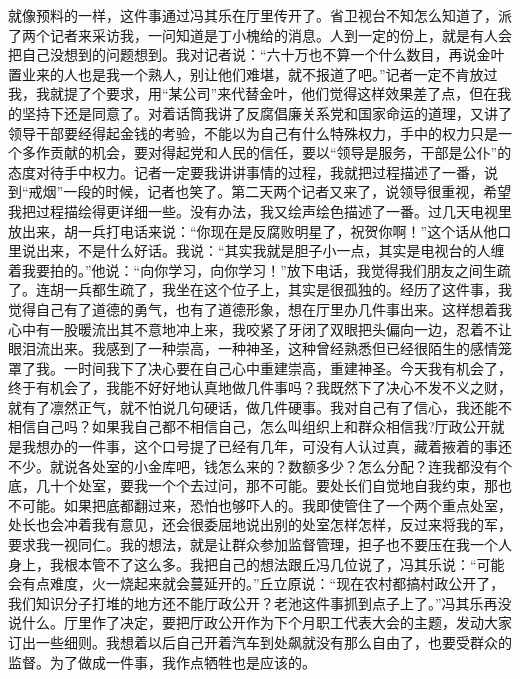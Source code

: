 \documentclass[12pt,oneside]{book}
\begin{document}
就像预料的一样，这件事通过冯其乐在厅里传开了。省卫视台不知怎么知道了，派了两个记者来采访我，一问知道是丁小槐给的消息。人到一定的份上，就是有人会把自己没想到的问题想到。我对记者说：``六十万也不算一个什么数目，再说金叶置业来的人也是我一个熟人，别让他们难堪，就不报道了吧。''记者一定不肯放过我，我就提了个要求，用``某公司''来代替金叶，他们觉得这样效果差了点，但在我的坚持下还是同意了。对着话筒我讲了反腐倡廉关系党和国家命运的道理，又讲了领导干部要经得起金钱的考验，不能以为自己有什么特殊权力，手中的权力只是一个多作贡献的机会，要对得起党和人民的信任，要以``领导是服务，干部是公仆''的态度对待手中权力。记者一定要我讲讲事情的过程，我就把过程描述了一番，说到``戒烟''一段的时候，记者也笑了。第二天两个记者又来了，说领导很重视，希望我把过程描绘得更详细一些。没有办法，我又绘声绘色描述了一番。过几天电视里放出来，胡一兵打电话来说：``你现在是反腐败明星了，祝贺你啊！''这个话从他口里说出来，不是什么好话。我说：``其实我就是胆子小一点，其实是电视台的人缠着我要拍的。''他说：``向你学习，向你学习！''放下电话，我觉得我们朋友之间生疏了。连胡一兵都生疏了，我坐在这个位子上，其实是很孤独的。经历了这件事，我觉得自己有了道德的勇气，也有了道德形象，想在厅里办几件事出来。这样想着我心中有一股暖流出其不意地冲上来，我咬紧了牙闭了双眼把头偏向一边，忍着不让眼泪流出来。我感到了一种崇高，一种神圣，这种曾经熟悉但已经很陌生的感情笼罩了我。一时间我下了决心要在自己心中重建崇高，重建神圣。今天我有机会了，终于有机会了，我能不好好地认真地做几件事吗？我既然下了决心不发不义之财，就有了凛然正气，就不怕说几句硬话，做几件硬事。我对自己有了信心，我还能不相信自己吗？如果我自己都不相信自己，怎么叫组织上和群众相信我?厅政公开就是我想办的一件事，这个口号提了已经有几年，可没有人认过真，藏着掖着的事还不少。就说各处室的小金库吧，钱怎么来的？数额多少？怎么分配？连我都没有个底，几十个处室，要我一个个去过问，那不可能。要处长们自觉地自我约束，那也不可能。如果把底都翻过来，恐怕也够吓人的。我即使管住了一个两个重点处室，处长也会冲着我有意见，还会很委屈地说出别的处室怎样怎样，反过来将我的军，要求我一视同仁。我的想法，就是让群众参加监督管理，担子也不要压在我一个人身上，我根本管不了这么多。我把自己的想法跟丘冯几位说了，冯其乐说：``可能会有点难度，火一烧起来就会蔓延开的。''丘立原说：``现在农村都搞村政公开了，我们知识分子打堆的地方还不能厅政公开？老池这件事抓到点子上了。''冯其乐再没说什么。厅里作了决定，要把厅政公开作为下个月职工代表大会的主题，发动大家订出一些细则。我想着以后自己开着汽车到处飙就没有那么自由了，也要受群众的监督。为了做成一件事，我作点牺牲也是应该的。
\end{document}
